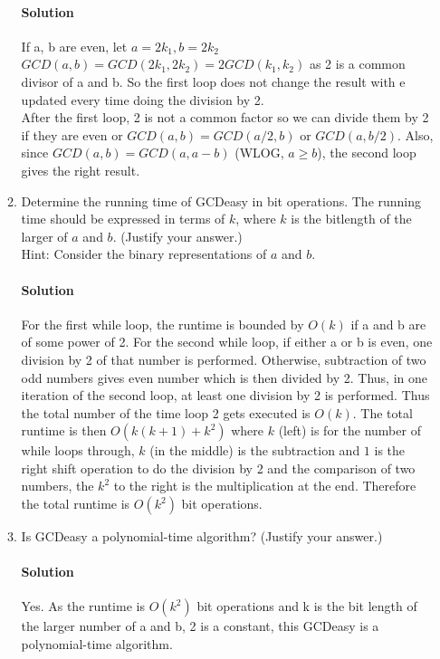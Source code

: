 \documentclass[11pt]{article}
\begin{document}
\begin{enumerate}
\begin{enumerate}
\paragraph{Solution}
If a, b are even, let $a=2k_1,b=2k_2$ $GCD(a,b)=GCD(2k_1,2k_2)=2GCD(k_1,k_2)$ as 2 is a common divisor of a and b. So the first loop does not change the result with e updated every time doing the division by 2. \\
After the first loop, 2 is not a common factor so we can divide them by 2 if they are even or $GCD(a,b) = GCD(a/2,b) \text{ or } GCD(a,b/2)$. Also, since $GCD(a,b)=GCD(a,a-b)$ (WLOG, $a\geq b$), the second loop gives the right result.


\item Determine the running time of GCDeasy in bit operations.
      The running time should be expressed in terms of $k$, where $k$
      is the bitlength of the larger of $a$ and $b$. (Justify your answer.)\\
      Hint: Consider the binary representations of $a$ and $b$.
\paragraph{Solution}
For the first while loop, the runtime is bounded by $O(k)$ if a and b are of some power of 2. For the second while loop,
if either a or b is even, one division by 2 of that number is performed. Otherwise, subtraction of two odd numbers gives even number which is then divided by 2. Thus, in one iteration of the second loop, at least one division by 2 is performed. Thus the total number of the time loop 2 gets executed is $O(k)$. The total runtime is then $O(k(k+1) + k^2)$ where $k$ (left) is for the number of while loops through, $k$ (in the middle) is the subtraction and $1$ is the right shift operation to do the division by 2 and the comparison of two numbers, the $k^2$ to the right is the multiplication at the end. Therefore the total runtime is $O(k^2)$ bit operations.

\item Is GCDeasy a polynomial-time algorithm? (Justify your answer.)
\paragraph{Solution}
Yes. As the runtime is $O(k^2)$ bit operations and k is the bit length of the larger number of a and b, 2 is a constant, this GCDeasy is a polynomial-time algorithm.
\end{enumerate}
\newpage


\end{enumerate}
\end{document}
